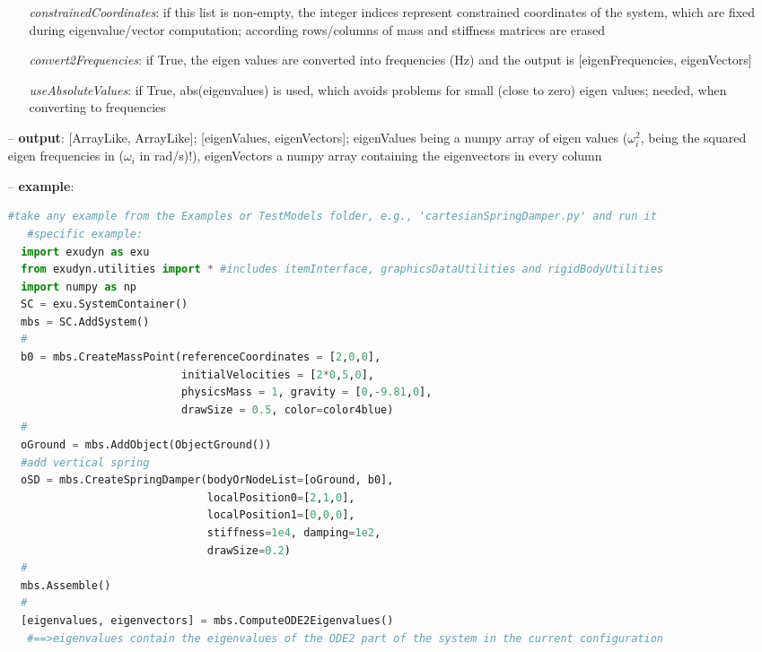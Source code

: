 \begin{itemize}[leftmargin=0.7cm]
\begin{itemize}[leftmargin=1.2cm]
\item[]{\it constrainedCoordinates}: if this list is non-empty, the integer indices represent constrained coordinates of the system, which are fixed during eigenvalue/vector computation; according rows/columns of mass and stiffness matrices are erased
\item[]{\it convert2Frequencies}: if True, the eigen values are converted into frequencies (Hz) and the output is [eigenFrequencies, eigenVectors]
\item[]{\it useAbsoluteValues}: if True, abs(eigenvalues) is used, which avoids problems for small (close to zero) eigen values; needed, when converting to frequencies
\end{itemize}
\item[--]
{\bf output}: [ArrayLike, ArrayLike]; [eigenValues, eigenVectors]; eigenValues being a numpy array of eigen values ($\omega_i^2$, being the squared eigen frequencies in ($\omega_i$ in rad/s)!), eigenVectors a numpy array containing the eigenvectors in every column
\item[--]
{\bf example}: \vspace{-12pt}\ei\begin{lstlisting}[language=Python, xleftmargin=36pt]
   #take any example from the Examples or TestModels folder, e.g., 'cartesianSpringDamper.py' and run it
   #specific example:
  import exudyn as exu
  from exudyn.utilities import * #includes itemInterface, graphicsDataUtilities and rigidBodyUtilities
  import numpy as np
  SC = exu.SystemContainer()
  mbs = SC.AddSystem()
  #
  b0 = mbs.CreateMassPoint(referenceCoordinates = [2,0,0],
                           initialVelocities = [2*0,5,0],
                           physicsMass = 1, gravity = [0,-9.81,0],
                           drawSize = 0.5, color=color4blue)
  #
  oGround = mbs.AddObject(ObjectGround())
  #add vertical spring
  oSD = mbs.CreateSpringDamper(bodyOrNodeList=[oGround, b0],
                               localPosition0=[2,1,0],
                               localPosition1=[0,0,0],
                               stiffness=1e4, damping=1e2,
                               drawSize=0.2)
  #
  mbs.Assemble()
  #
  [eigenvalues, eigenvectors] = mbs.ComputeODE2Eigenvalues()
   #==>eigenvalues contain the eigenvalues of the ODE2 part of the system in the current configuration
\end{lstlisting}\vspace{-24pt}\bi\item[]\vspace{-24pt}\vspace{12pt}\end{itemize}
%

